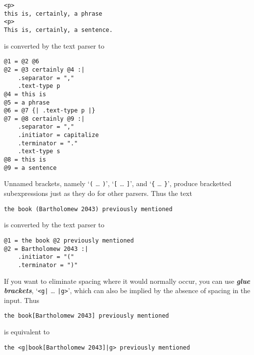 \documentclass[12pt]{article}
\newcommand{\skey}[2]{{\bf \em #1#2}\index{#1}}
\newenvironment{indpar}[1][0.3in]%
	{\begin{list}{}%
		     {\setlength{\itemsep}{0in}%
		      \setlength{\topsep}{0in}%
		      \setlength{\parsep}{1ex}%
		      \setlength{\labelwidth}{#1}%
		      \setlength{\leftmargin}{#1}%
		      \addtolength{\leftmargin}{\labelsep}}%
	 \item}%
	{\end{list}}
\begin{document}
\begin{indpar}\begin{verbatim}
<p>
this is, certainly, a phrase
<p>
This is, certainly, a sentence.
\end{verbatim}\end{indpar}

is converted by the text parser to

\begin{indpar}\begin{verbatim}
@1 = @2 @6
@2 = @3 certainly @4 :|
    .separator = ","
    .text-type p
@4 = this is
@5 = a phrase
@6 = @7 {| .text-type p |}
@7 = @8 certainly @9 :|
    .separator = ","
    .initiator = capitalize
    .terminator = "."
    .text-type s
@8 = this is
@9 = a sentence
\end{verbatim}\end{indpar}

Unnamed brackets, namely
`\verb|(| \ldots{} \verb|)|',
`\verb|[| \ldots{} \verb|]|', and
`\verb|{| \ldots{} \verb|}|',
produce bracketted subexpressions just as they do for other
parsers.  Thus the text

\begin{indpar}\begin{verbatim}
the book (Bartholomew 2043) previously mentioned
\end{verbatim}\end{indpar}

is converted by the text parser to

\begin{indpar}\begin{verbatim}
@1 = the book @2 previously mentioned
@2 = Bartholomew 2043 :|
    .initiator = "("
    .terminator = ")"
\end{verbatim}\end{indpar}

If you want to eliminate spacing where it would normally occur,
you can use \skey{glue bracket}s, `\verb/<g|/ \ldots{} \verb/|g>/',
which can also be implied by the absence of spacing in the input.
Thus

\begin{indpar}\begin{verbatim}
the book[Bartholomew 2043] previously mentioned
\end{verbatim}\end{indpar}

is equivalent to

\begin{indpar}\begin{verbatim}
the <g|book[Bartholomew 2043]|g> previously mentioned
\end{verbatim}\end{indpar}
\end{document}
